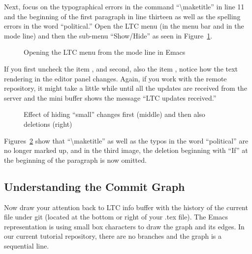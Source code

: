 Next, focus on the typographical errors in the command ``\textbackslash maketitle'' in line 11 and the beginning of the first paragraph in line thirteen as well as the spelling errors in the word ``political.''  Open the LTC menu (in the menu bar and in the mode line) and then the sub-menu ``Show/Hide'' as seen in Figure~\ref{fig:svn-emacs-LTC-menu}.  
\begin{figure}[t]
\centering
{}
\caption{Opening the LTC menu from the mode line in Emacs} \label{fig:svn-emacs-LTC-menu}
\end{figure}
If you first uncheck the item , and second, also the item , notice how the text rendering in the editor panel changes.  Again, if you work with the remote repository, it might take a little while until all the updates are received from the server and the mini buffer shows the message ``LTC updates received.''
\begin{figure}[t]
  \centering
  \hspace{2em}
  \hspace{2em}
\caption[Effect of hiding ``small'' changes and deletions]{Effect of hiding ``small'' changes first (middle) and then also deletions (right)} \label{fig:svn-emacs-filter-small}
\end{figure}
Figures~\ref{fig:svn-emacs-filter-small} show that ``\textbackslash maketitle'' as well as the typos in the word ``political'' are no longer marked up, and in the third image, the deletion beginning with ``If'' at the beginning of the paragraph is now omitted.

\subsection{Understanding the Commit Graph}

Now draw your attention back to LTC info buffer with the history of the current file under git (located at the bottom or right of your .tex file).  The Emacs representation is using small box characters to draw the graph and its edges.  In our current tutorial repository, there are no branches and the graph is a sequential line.  

